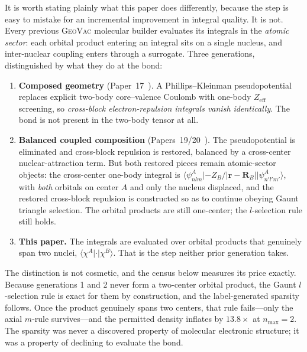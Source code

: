 \documentclass[aps,pra,twocolumn,superscriptaddress,longbibliography]{revtex4-2}
\begin{document}
It is worth stating plainly what this paper does differently, because the
step is easy to mistake for an incremental improvement in integral quality.
It is not.  Every previous \textsc{GeoVac} molecular builder evaluates its
integrals in the \emph{atomic sector}: each orbital product entering an
integral sits on a single nucleus, and inter-nuclear coupling enters
through a surrogate.  Three generations, distinguished by what they do at
the bond:

\begin{enumerate}
\item \textbf{Composed geometry} (Paper~17~\cite{loutey_paper17}).  A
  Phillips--Kleinman pseudopotential replaces explicit two-body
  core--valence Coulomb with one-body $Z_{\mathrm{eff}}$ screening, so
  \emph{cross-block electron-repulsion integrals vanish identically}.  The
  bond is not present in the two-body tensor at all.

\item \textbf{Balanced coupled composition}
  (Papers~19/20~\cite{loutey_paper19,loutey_paper20}).  The pseudopotential
  is eliminated and cross-block repulsion is restored, balanced by a
  cross-center nuclear-attraction term.  But both restored pieces remain
  atomic-sector objects: the cross-center one-body integral is
  $\langle \psi^{A}_{nlm} | -Z_B/|\mathbf{r}-\mathbf{R}_B| |
  \psi^{A}_{n'l'm'} \rangle$, with \emph{both} orbitals on center $A$ and
  only the nucleus displaced, and the restored cross-block repulsion is
  constructed so as to continue obeying Gaunt triangle selection.  The
  orbital products are still one-center; the $l$-selection rule still holds.

\item \textbf{This paper.}  The integrals are evaluated over orbital
  products that genuinely span two nuclei, $\langle \chi^{A} | \cdot |
  \chi^{B} \rangle$.  That is the step neither prior generation takes.
\end{enumerate}

The distinction is not cosmetic, and the census below measures its price
exactly.  Because generations 1 and 2 never form a two-center orbital
product, the Gaunt $l$-selection rule is exact for them by construction,
and the label-generated sparsity follows.  Once the product genuinely
spans two centers, that rule fails---only the axial $m$-rule survives---and
the permitted density inflates by $13.8\times$ at $n_{\max} = 2$.  The
sparsity was never a discovered property of molecular electronic structure;
it was a property of declining to evaluate the bond.
\end{document}
